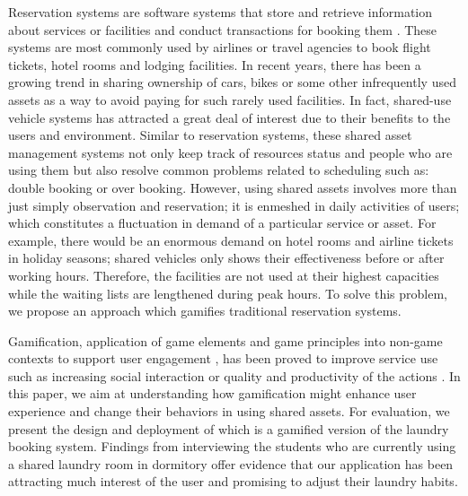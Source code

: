 Reservation systems are software systems that store and retrieve information about services or facilities and conduct transactions for booking them \cite{wiki:CRS}. These systems are most commonly used by airlines or travel agencies to book flight tickets, hotel rooms and lodging facilities. In recent years, there has been a growing trend in sharing ownership of cars, bikes or some other infrequently used assets as a way to avoid paying for such rarely used facilities. In fact, shared-use vehicle systems \cite{nextbike, barth2002shared} has attracted a great deal of interest due to their benefits to the users and environment. Similar to reservation systems, these shared asset management systems not only keep track of resources status and people who are using them but also resolve common problems related to scheduling such as: double booking or over booking. However, using shared assets involves more than just simply observation and reservation; it is enmeshed in daily activities of users; which constitutes a fluctuation in demand of a particular service or asset. For example, there would be an enormous demand on hotel rooms and airline tickets in holiday seasons; shared vehicles only shows their effectiveness before or after working hours. Therefore, the facilities are not used at their highest capacities while the waiting lists are lengthened during peak hours. To solve this problem, we propose an approach which gamifies traditional reservation systems.

Gamification, application of game elements and game principles into non-game contexts to support user engagement \cite{deterding2011gamification}, has been proved to improve service use such as increasing social interaction or quality and productivity of the actions \cite{hamari2014does}. In this paper, we aim at understanding how gamification might enhance user experience and change their behaviors in using shared assets. For evaluation, we present the design and deployment of {\toolname} which is a gamified version of the laundry booking system. Findings from interviewing the students who are currently using a shared laundry room in dormitory offer evidence that our application has been attracting much interest of the user and promising to adjust their laundry habits.